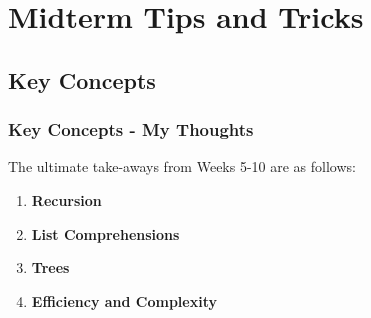 \documentclass[hyperref={colorlinks,citecolor=blue,linkcolor=blue,urlcolor=blue}, aspectratio=1610]{beamer}
\begin{document}

\section{Midterm Tips and Tricks}
\subsection{Key Concepts}

\begin{frame}
  \frametitle{Key Concepts - My Thoughts} 
  The ultimate take-aways from Weeks 5-10 are as follows:
  \begin{enumerate}
    \item \textbf{Recursion}
    \pause
    \item \textbf{List Comprehensions}
    \pause
    \item \textbf{Trees}
    \pause
    \item \textbf{Efficiency and Complexity}
  \end{enumerate}
\end{frame}
\end{document}
